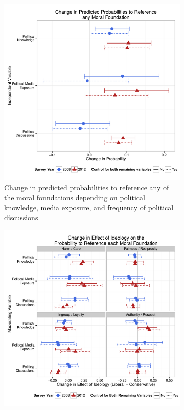 \documentclass[12pt]{article}
\begin{document}
\begin{figure}[h]
  \centering
  \caption{INSERT DESCRIPTION}
  \begin{subfigure}[t]{0.49\textwidth}
    \includegraphics[scale=.35]{../calc/fig/appD7learn.pdf}
    \caption{Change in predicted probabilities to reference any of the moral foundations depending on political knowledge, media exposure, and frequency of political discussions}\label{fig:appD7learn}
  \end{subfigure}
  \begin{subfigure}[t]{0.49\textwidth}
    \includegraphics[scale=.35]{../calc/fig/appD8ideolearn.pdf}

\end{subfigure}
\end{figure}
\end{document}
